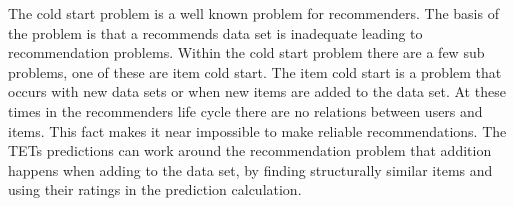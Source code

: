 The cold start problem is a well known problem for recommenders\cite{Ricci2015}\cite{saveski2014item}.
The basis of the problem is that a recommends data set is 
inadequate leading to recommendation problems.
Within the cold start problem there are a few sub problems, one of these are item cold start.
The item cold start is a problem that occurs with new data sets or when new items are added to the data set.
At these times in the recommenders life cycle there are no relations between users and items.
This fact makes it near impossible to make reliable recommendations.
The TETs predictions can work around the recommendation problem that addition happens when adding to the data set, by finding structurally similar items and using their ratings in the prediction calculation.